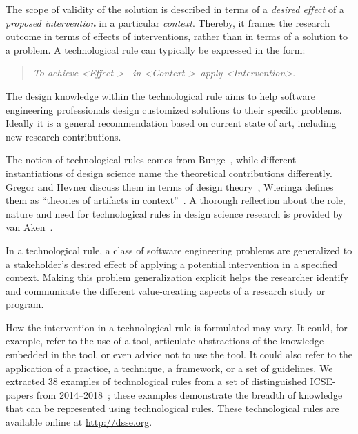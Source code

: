 \documentclass[graybox]{svmult}
\begin{document}
The scope of validity of the solution is described in terms of a  \emph{desired effect} of a \emph{proposed intervention} in a particular \emph{context}. Thereby, it frames the research outcome in terms of effects of interventions, rather than in terms of a solution to a problem. A technological rule can typically be expressed in the form: 

\begin{quote}{\emph{To achieve \textless Effect \textgreater ~ in \textless Context \textgreater~apply \textless Intervention\textgreater}.} 
\end{quote}
The design knowledge within the technological rule aims to help software engineering professionals design customized solutions to their specific problems. Ideally it is a general recommendation based on current state of art, including new research contributions.

The notion of technological rules comes from Bunge~\cite{bunge_philosophy_1998}, while different instantiations of design science name the theoretical contributions differently. Gregor and Hevner discuss them in terms of design theory~\cite{gregor_positioning_2013}, Wieringa defines them as ``theories of artifacts in context''~\cite{wieringa_design_2009}. A thorough reflection about the role, nature and need for  technological rules in design science research is provided by van Aken~\cite{van_aken_management_2004}. 

In a technological rule, a class of software engineering problems are generalized to a stakeholder's desired effect of applying a potential intervention in a specified context. 
Making this problem generalization explicit helps the researcher identify and communicate the different value-creating aspects of a research study or program.

How the intervention in a technological rule is formulated may vary. It could, for example, refer to the use of a tool, articulate abstractions of the knowledge embedded in the tool, or even advice not to use the tool.
It could also refer to the application of a practice, a technique, a framework, or a set of guidelines. We extracted 38 examples of technological rules from a set of distinguished ICSE-papers from 2014--2018~\cite{Engstrom19arxiv}; these examples demonstrate the breadth of knowledge that can be represented using technological rules. These technological rules are available online at \url{http://dsse.org}.
\end{document}
